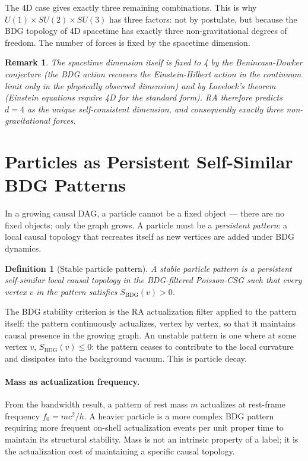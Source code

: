 \documentclass[11pt,a4paper]{article}
\newtheorem{definition}[theorem]{Definition}
\newtheorem{remark}[theorem]{Remark}
\newcommand{\SBDG}{S_{\mathrm{BDG}}}
\begin{document}
The 4D case gives exactly three remaining combinations. This is why
$U(1) \times SU(2) \times SU(3)$ has three factors: not by postulate, but
because the BDG topology of 4D spacetime has exactly three non-gravitational
degrees of freedom. The number of forces is fixed by the spacetime dimension.

\begin{remark}
The spacetime dimension itself is fixed to 4 by the Benincasa-Dowker conjecture
(the BDG action recovers the Einstein-Hilbert action in the continuum limit
only in the physically observed dimension) and by Lovelock's theorem (Einstein
equations require 4D for the standard form). RA therefore predicts $d = 4$ as
the unique self-consistent dimension, and consequently exactly three
non-gravitational forces.
\end{remark}

\section{Particles as Persistent Self-Similar BDG Patterns}
\label{sec:particles}

In a growing causal DAG, a particle cannot be a fixed object --- there are no
fixed objects; only the graph grows. A particle must be a \emph{persistent
pattern}: a local causal topology that recreates itself as new vertices are
added under BDG dynamics.

\begin{definition}[Stable particle pattern]
A stable particle pattern is a persistent self-similar local causal topology
in the BDG-filtered Poisson-CSG such that every vertex $v$ in the pattern
satisfies $\SBDG(v) > 0$.
\end{definition}

The BDG stability criterion is the RA actualization filter applied to the
pattern itself: the pattern continuously actualizes, vertex by vertex, so that
it maintains causal presence in the growing graph. An unstable pattern is one
where at some vertex $v$, $\SBDG(v) \leq 0$: the pattern ceases to contribute
to the local curvature and dissipates into the background vacuum. This is
particle decay.

\paragraph{Mass as actualization frequency.}
From the bandwidth result, a pattern of rest mass $m$ actualizes at rest-frame
frequency $f_0 = mc^2/h$. A heavier particle is a more complex BDG pattern
requiring more frequent on-shell actualization events per unit proper time to
maintain its structural stability. Mass is not an intrinsic property of a
label; it is the actualization cost of maintaining a specific causal topology.
\end{document}
